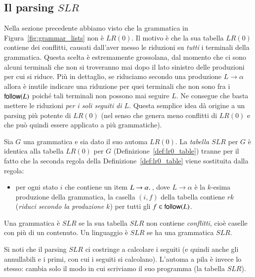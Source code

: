\subsection{Il parsing $\mathit{SLR}$}\label{subsec:slr}
%
Nella sezione precedente abbiamo visto che la grammatica in
Figura~\ref{fig:grammar_lists} non \`e $\mathit{LR}(0)$. Il motivo \`e che
la sua tabella $\mathit{LR}(0)$
contiene dei conflitti, causati dall'aver messo le
riduzioni su \emph{tutti} i terminali della grammatica.
Questa scelta \`e estremamente
grossolana, dal momento che ci sono alcuni terminali che non si troveranno
mai dopo il lato sinistro delle produzioni per cui si riduce.
Pi\`u in dettaglio, se riduciamo secondo una produzione
$L\to\alpha$ allora \`e inutile indicare una riduzione per quei terminali che
non sono fra i $\mathsf{follow}(L)$ poich\'e tali terminali non possono mai seguire
$L$. Ne consegue che basta mettere le riduzioni
\emph{per i soli seguiti di $L$}. Questa semplice idea d\`a origine
a un parsing pi\`u potente di $\mathit{LR}(0)$
(nel senso che genera meno conflitti
di $\mathit{LR}(0)$ e che pu\`o quindi essere applicato a pi\`u grammatiche).
%
\begin{definition}\label{def:slr_table}
Sia $G$ una grammatica e sia dato il suo automa $\mathit{LR}(0)$.
La \emph{tabella $\mathit{SLR}$} per $G$ \`e identica alla tabella
$\mathit{LR}(0)$
per $G$ (Definizione~\ref{def:lr0_table}) tranne per il fatto che la seconda
regola della Definizione~\ref{def:lr0_table} viene sostituita dalla regola:
\begin{itemize}
\item per ogni stato $i$ che contiene un item $L\to\alpha.\,$, dove
      $L\to\alpha$ \`e la $k$-esima produzione della grammatica, la casella
      $(i,f)$ della tabella contiene $rk$
      (\emph{riduci secondo la produzione $k$}) per tutti gli
      $f\in\mathsf{follow}(L)$.
\end{itemize}
\end{definition}
%
\begin{definition}\label{def:slr_grammar}
Una grammatica \`e $\mathit{SLR}$ se la sua tabella $\mathit{SLR}$ non contiene
\emph{conflitti},
cio\`e caselle con pi\`u di un contenuto. Un linguaggio \`e $\mathit{SLR}$ se
ha una grammatica $\mathit{SLR}$.
\end{definition}
%
\noindent
Si noti che il parsing $\mathit{SLR}$ ci costringe a calcolare i seguiti
(e quindi anche gli annullabili e i primi, con cui i seguiti si
calcolano). L'automa a pila \`e invece lo stesso: cambia solo il modo
in cui scriviamo il suo programma (la tabella $\mathit{SLR}$).

